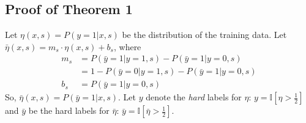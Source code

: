 \subsection{Proof of Theorem 1}
Let $\eta(x,s)=P(y=1|x,s)$ be the distribution of the training data.
Let $\bar{\eta}(x, s)=m_s\cdot\eta(x,s)+b_s$, where
\begin{align}
  m_s&=P(\bar{y}=1|y=1,s)-P(\bar{y}=1|y=0,s)\nonumber\\
  &=1-P(\bar{y}=0|y=1,s)-P(\bar{y}=1|y=0,s)\\
  b_s&=P(\bar{y}=1|y=0,s)
\end{align}
So, $\bar{\eta}(x, s)=P(\bar{y}=1|x, s)$.
Let $y$ denote the \emph{hard} labels for $\eta$: $y=\mathbb{I}\left[\eta>\tfrac{1}{2}\right]$ and $\bar{y}$ be the hard labels for $\bar{\eta}$: $\bar{y}=\mathbb{I}\left[\bar{\eta}>\tfrac{1}{2}\right]$.

